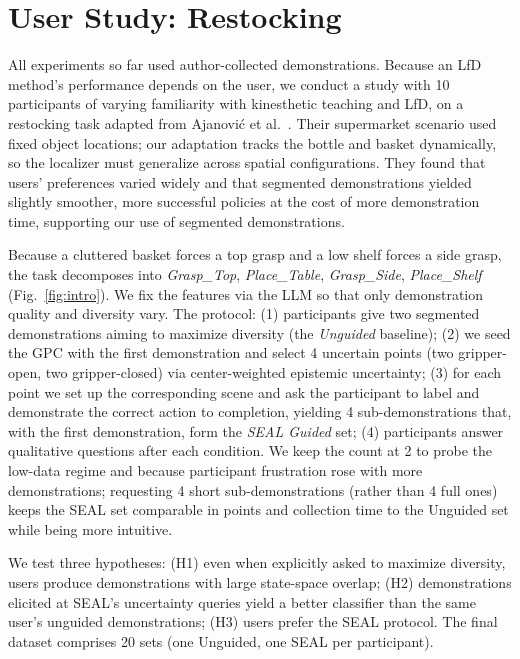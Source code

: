 \section{User Study: Restocking}
\label{sec:user_study}
All experiments so far used author-collected demonstrations. Because an LfD method's performance depends on the user, we conduct a study with 10 participants of varying familiarity with kinesthetic teaching and LfD, on a restocking task adapted from Ajanovi\'c et al.~\cite{11369949}. Their supermarket scenario used fixed object locations; our adaptation tracks the bottle and basket dynamically, so the localizer must generalize across spatial configurations. They found that users' preferences varied widely and that segmented demonstrations yielded slightly smoother, more successful policies at the cost of more demonstration time, supporting our use of segmented demonstrations.

Because a cluttered basket forces a top grasp and a low shelf forces a side grasp, the task decomposes into \textit{Grasp\_Top}, \textit{Place\_Table}, \textit{Grasp\_Side}, \textit{Place\_Shelf} (Fig.~\ref{fig:intro}). We fix the features via the LLM so that only demonstration quality and diversity vary. The protocol: (1) participants give two segmented demonstrations aiming to maximize diversity (the \emph{Unguided} baseline); (2) we seed the GPC with the first demonstration and select 4 uncertain points (two gripper-open, two gripper-closed) via center-weighted epistemic uncertainty; (3) for each point we set up the corresponding scene and ask the participant to label and demonstrate the correct action to completion, yielding 4 sub-demonstrations that, with the first demonstration, form the \emph{SEAL Guided} set; (4) participants answer qualitative questions after each condition. We keep the count at 2 to probe the low-data regime and because participant frustration rose with more demonstrations; requesting 4 short sub-demonstrations (rather than 4 full ones) keeps the SEAL set comparable in points and collection time to the Unguided set while being more intuitive.

We test three hypotheses: (H1) even when explicitly asked to maximize diversity, users produce demonstrations with large state-space overlap; (H2) demonstrations elicited at SEAL's uncertainty queries yield a better classifier than the same user's unguided demonstrations; (H3) users prefer the SEAL protocol. The final dataset comprises 20 sets (one Unguided, one SEAL per participant).

